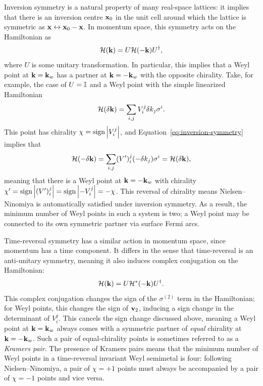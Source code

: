 Inversion symmetry is a natural property of many real-space lattices: it implies that there is an inversion centre $\vb{x}_0$ in the unit cell around which the lattice is symmetric as $\vb{x}\leftrightarrow\vb{x}_0-\vb{x}$. In momentum space, this symmetry acts on the Hamiltonian as
\begin{equation}\label{eq:inversion-symmetry}
	\mathcal{H}(\vb{k}) = U\mathcal{H}(-\vb{k})U^\dag,
\end{equation}
where $U$ is some unitary transformation. In particular, this implies that a Weyl point at $\vb{k}=\vb{k}_w$ has a partner at $\vb{k}=-\vb{k}_w$ with the opposite chirality. Take, for example, the case of $U=\mathbb{I}$ and a Weyl point with the simple linearized Hamiltonian 
\begin{equation*}
	\mathcal{H}(\delta\vb{k}) = \sum_{i,j}V_i^j\delta k_j \sigma^i.
\end{equation*}
This point has chirality $\chi = \operatorname{sign}\abs{V_i^j}$, and Equation~\eqref{eq:inversion-symmetry} implies that
\begin{equation*}
	\mathcal{H}(-\delta\vb{k}) = \sum_{i,j}(V')_i^j(-\delta k_j)\sigma^i = \mathcal{H}(\delta\vb{k}),
\end{equation*}
meaning that there is a Weyl point at $\vb{k}=-\vb{k}_w$ with chirality $\chi' = \operatorname{sign}\abs{(V')_i^j} = \operatorname{sign}\abs{-V_i^j} = -\chi$. This reversal of chirality means Nielsen--Ninomiya is automatically satisfied under inversion symmetry. As a result, the minimum number of Weyl points in such a system is two; a Weyl point may be connected to its own symmetric partner via surface Fermi arcs. %

Time-reversal symmetry has a similar action in momentum space, since momentum has a time component. It differs in the sense that time-reversal is an anti-unitary symmetry, meaning it also induces complex conjugation on the Hamiltonian:
\begin{equation*}
	\mathcal{H}(\vb{k}) = U\mathcal{H}^*(-\vb{k})U^\dag.
\end{equation*}
This complex conjugation changes the sign of the $\sigma^{(2)}$ term in the Hamiltonian; for Weyl points, this changes the sign of $\vb{v}_2$, inducing a sign change in the determinant of $V_i^j$. This cancels the sign change discussed above, meaning a Weyl point at $\vb{k}=\vb{k}_w$ always comes with a symmetric partner of \emph{equal} chirality at $\vb{k}=-\vb{k}_w$. Such a pair of equal-chirality points is sometimes referred to as a \emph{Kramers pair}. %
The presence of Kramers pairs means that the minimum number of Weyl points in a time-reversal invariant Weyl semimetal is four: following Nielsen--Ninomiya, a pair of $\chi = +1$ points must always be accompanied by a pair of $\chi=-1$ points and vice versa.

